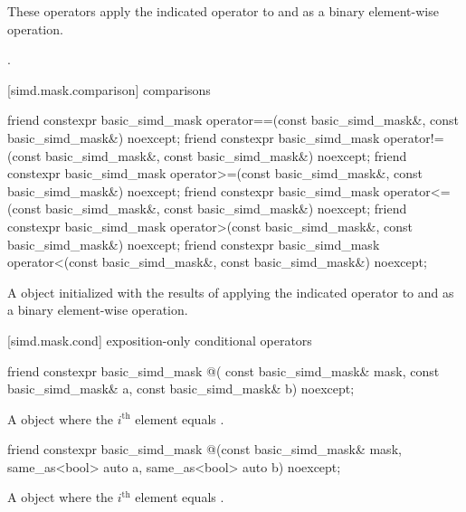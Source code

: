 \begin{itemdescr}
  \pnum\effects
  These operators apply the indicated operator to  and  as a binary
  element-wise operation.

  \pnum\returns
  .
\end{itemdescr}

[simd.mask.comparison]{ comparisons}

\begin{itemdecl}
friend constexpr basic_simd_mask
  operator==(const basic_simd_mask&, const basic_simd_mask&) noexcept;
friend constexpr basic_simd_mask
  operator!=(const basic_simd_mask&, const basic_simd_mask&) noexcept;
friend constexpr basic_simd_mask
  operator>=(const basic_simd_mask&, const basic_simd_mask&) noexcept;
friend constexpr basic_simd_mask
  operator<=(const basic_simd_mask&, const basic_simd_mask&) noexcept;
friend constexpr basic_simd_mask
  operator>(const basic_simd_mask&, const basic_simd_mask&) noexcept;
friend constexpr basic_simd_mask
  operator<(const basic_simd_mask&, const basic_simd_mask&) noexcept;
\end{itemdecl}

\begin{itemdescr}
  \pnum\returns
  A  object initialized with the results of applying the indicated operator
  to  and  as a binary element-wise operation.
\end{itemdescr}

[simd.mask.cond]{ exposition-only conditional operators}

\begin{itemdecl}
friend constexpr basic_simd_mask @\simdselect@(
  const basic_simd_mask& mask, const basic_simd_mask& a, const basic_simd_mask& b) noexcept;
\end{itemdecl}

\begin{itemdescr}
  \pnum\returns
  A  object where the $i^\text{th}$ element equals  \foralli.
\end{itemdescr}

\begin{itemdecl}
friend constexpr basic_simd_mask
@\simdselect@(const basic_simd_mask& mask, same_as<bool> auto a, same_as<bool> auto b) noexcept;
\end{itemdecl}

\begin{itemdescr}
  \pnum\returns
  A  object where the $i^\text{th}$ element equals 
  \foralli.
\end{itemdescr}

